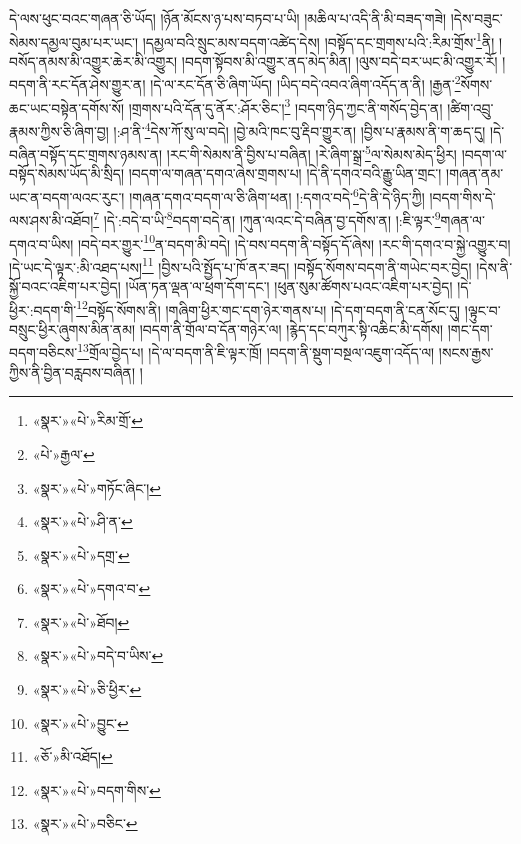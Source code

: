 དེ་ལས་ཕུང་བའང་གཞན་ཅི་ཡོད། །ཉོན་མོངས་ཉ་པས་བཏབ་པ་ཡི། །མཆིལ་པ་འདི་ནི་མི་བཟད་གཟེ། །དེས་བཟུང་སེམས་དམྱལ་བུམ་པར་ཡང་། །དམྱལ་བའི་སྲུང་མས་བདག་འཚེད་དེས། །བསྟོད་དང་གྲགས་པའི་:རིམ་གྲོས་\footnote{«སྣར་»«པེ་»རིམ་གྲོ་}ནི། །བསོད་ནམས་མི་འགྱུར་ཆེར་མི་འགྱུར། །བདག་སྟོབས་མི་འགྱུར་ནད་མེད་མིན། །ལུས་བདེ་བར་ཡང་མི་འགྱུར་རོ། །བདག་ནི་རང་དོན་ཤེས་གྱུར་ན། །དེ་ལ་རང་དོན་ཅི་ཞིག་ཡོད། །ཡིད་བདེ་འབའ་ཞིག་འདོད་ན་ནི། །རྒྱན་\footnote{«པེ་»རྒྱལ་}སོགས་ཆང་ཡང་བསྟེན་དགོས་སོ། །གྲགས་པའི་དོན་དུ་ནོར་:ཤོར་ཅིང་།\footnote{«སྣར་»«པེ་»གཏོང་ཞིང་།} །བདག་ཉིད་ཀྱང་ནི་གསོད་བྱེད་ན། །ཚིག་འབྲུ་རྣམས་ཀྱིས་ཅི་ཞིག་བྱ། །:ཤ་ནི་\footnote{«སྣར་»«པེ་»ཤི་ན་}དེས་ཀོ་སུ་ལ་བདེ། །བྱེ་མའི་ཁང་བུ་རྡིབ་གྱུར་ན། །བྱིས་པ་རྣམས་ནི་ག་ཆད་དུ། །དེ་བཞིན་བསྟོད་དང་གྲགས་ཉམས་ན། །རང་གི་སེམས་ནི་བྱིས་པ་བཞིན། །རེ་ཞིག་སྒྲ་\footnote{«སྣར་»«པེ་»དགྲ་}ལ་སེམས་མེད་ཕྱིར། །བདག་ལ་བསྟོད་སེམས་ཡོད་མི་སྲིད། །བདག་ལ་གཞན་དགའ་ཞེས་གྲགས་པ། །དེ་ནི་དགའ་བའི་རྒྱུ་ཡིན་གྲང་། །གཞན་ནམ་ཡང་ན་བདག་ལའང་རུང་། །གཞན་དགའ་བདག་ལ་ཅི་ཞིག་ཕན། །:དགའ་བདེ་\footnote{«སྣར་»«པེ་»དགའ་བ་}དེ་ནི་དེ་ཉིད་ཀྱི། །བདག་གིས་དེ་ལས་ཤས་མི་འཐོབ།\footnote{«སྣར་»«པེ་»ཐོབ།} །དེ་:བདེ་བ་ཡི་\footnote{«སྣར་»«པེ་»བདེ་བ་ཡིས་}བདག་བདེ་ན། །ཀུན་ལའང་དེ་བཞིན་བྱ་དགོས་ན། །:ཇི་ལྟར་\footnote{«སྣར་»«པེ་»ཅི་ཕྱིར་}གཞན་ལ་དགའ་བ་ཡིས། །བདེ་བར་གྱུར་\footnote{«སྣར་»«པེ་»བྱུང་}ན་བདག་མི་བདེ། །དེ་བས་བདག་ནི་བསྟོད་དོ་ཞེས། །རང་གི་དགའ་བ་སྐྱེ་འགྱུར་བ། །དེ་ཡང་དེ་ལྟར་:མི་འཐད་པས།\footnote{«ཅོ་»མི་འཐོད།} །བྱིས་པའི་སྤྱོད་པ་ཁོ་ནར་ཟད། །བསྟོད་སོགས་བདག་ནི་གཡེང་བར་བྱེད། །དེས་ནི་སྐྱོ་བའང་འཇིག་པར་བྱེད། །ཡོན་ཏན་ལྡན་ལ་ཕྲག་དོག་དང་། །ཕུན་སུམ་ཚོགས་པའང་འཇིག་པར་བྱེད། །དེ་ཕྱིར་:བདག་གི་\footnote{«སྣར་»«པེ་»བདག་གིས་}བསྟོད་སོགས་ནི། །གཞིག་ཕྱིར་གང་དག་ཉེར་གནས་པ། །དེ་དག་བདག་ནི་ངན་སོང་དུ། །ལྟུང་བ་བསྲུང་ཕྱིར་ཞུགས་མིན་ནམ། །བདག་ནི་གྲོལ་བ་དོན་གཉེར་ལ། །རྙེད་དང་བཀུར་སྟི་འཆིང་མི་དགོས། །གང་དག་བདག་བཅིངས་\footnote{«སྣར་»«པེ་»བཅིང་}གྲོལ་བྱེད་པ། །དེ་ལ་བདག་ནི་ཇི་ལྟར་ཁྲོ། །བདག་ནི་སྡུག་བསྔལ་འཇུག་འདོད་ལ། །སངས་རྒྱས་ཀྱིས་ནི་བྱིན་བརླབས་བཞིན། །
